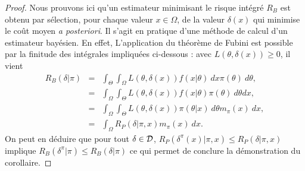 \begin{proof}%
Nous prouvons ici qu'un estimateur minimisant le risque intégré $R_B$ est obtenu par sélection, pour chaque valeur $x\in\Omega$, de la valeur $\delta(x)$ qui minimise le coût moyen {\it a posteriori}. Il s'agit en pratique d'une méthode de calcul d'un estimateur bayésien. En effet,
L'application du théorème de Fubini est possible par la finitude des intégrales impliquées ci-dessous : avec $L(\theta,\delta(x))\geq 0$, il vient
\begin{eqnarray*}
R_B(\delta|\pi) & = & \int_{\Theta}\int_{\Omega} L(\theta,\delta(x)) f(x|\theta) \ dx \pi(\theta) \ d\theta, \\
&= & \int_{\Omega} \int_{\Theta} L(\theta,\delta(x)) f(x|\theta) \pi(\theta) \ d\theta dx, \\
& = & \int_{\Omega} \int_{\Theta} L(\theta,\delta(x)) \pi(\theta|x) \ d\theta m_{\pi}(x) \ dx, \\
& = & \int_{\Omega} R_P(\delta|\pi,x) m_{\pi}(x) \ dx.
\end{eqnarray*}
On peut en déduire que pour tout $\delta\in{\cal{D}}$, 
$R_P\left(\delta^{\pi}(x)|\pi,x\right)  \leq  R_P\left(\delta|\pi,x\right)
$%
implique
$R_B\left(\delta^{\pi}|\pi\right)  \leq  R_B\left(\delta|\pi\right)
$%
ce qui permet de conclure la démonstration du corollaire.
 \end{proof}